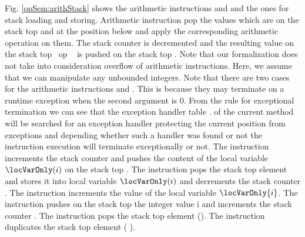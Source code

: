 Fig. \ref{opSem:arithStack}  shows the  arithmetic instructions and and the ones  for stack loading and  storing. 
Arithmetic instruction pop the values which are on the stack top \stackOnlyParam{\counterOnly}  and   at the position below
 and apply the corresponding arithmetic operation on them.
 The stack counter is decremented and  the resulting  value on the stack top  \ \rm{op} \ \stackOnlyParam{\counterOnly}
 is pushed on the stack  top  . Note that our formalization does not take into consideration overflow of arithmetic instructions.
Here, we assume that we can manipulate any unbounded integers.  
Note that there are two cases for the arithmetic instructions   and . This is because they 
may terminate on a runtime exception when the second argument is 0. From the rule for exceptional termination
 we can see that the exception handler table \methodd.\excHandlerTable{} of the current method will be searched 
for an exception handler protecting the current position \pc{} from \ArithExc{} exceptions and depending whether such a handler was
found or not the instruction execution will terminate exceptionally or not. 
  The instruction \load{} increments the stack counter  \counterOnly and pushes
 the content of the local variable $\locVarOnly(i)$ on the stack top .  
The instruction \store{} pops the stack top element \stackOnlyParam{\counterOnly}  and stores it into
 local variable $\locVarOnly(i)$ and  decrements the stack counter \counterOnly.  
The instruction \iinc{} increments the value of the local variable $\locVarOnly{i}$.   
The instruction  \push{} pushes on the stack top the integer value \textrm{i}
 and increments the stack counter \counterOnly{}. The instruction \pop{} pops the stack top element
 \stackOnly(\counterOnly). The instruction \dup{} duplicates the stack top element  \stackOnly( \counterOnly ).  


